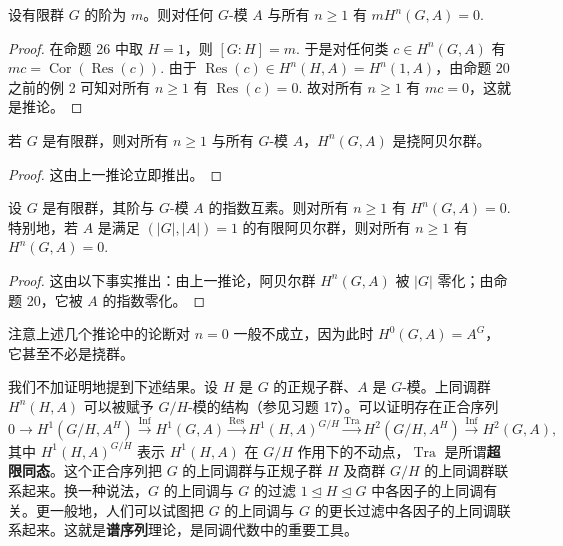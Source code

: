 \begin{corollary}\label{cor:17.27}
设有限群 \(G\) 的阶为 \(m\)。则对任何 \(G\)-模 \(A\) 与所有 \(n \geq 1\) 有 \(mH^n(G, A) = 0\).
\end{corollary}

\begin{proof}
在命题 26 中取 \(H = 1\)，则 \([G:H] = m\). 于是对任何类 \(c \in H^n(G, A)\) 有 \(mc = \operatorname{Cor}(\operatorname{Res}(c))\). 由于 \(\operatorname{Res}(c) \in H^n(H, A) = H^n(1, A)\)，由命题 20 之前的例 2 可知对所有 \(n \geq 1\) 有 \(\operatorname{Res}(c) = 0\). 故对所有 \(n \geq 1\) 有 \(mc = 0\)，这就是推论。
\end{proof}

\begin{corollary}\label{cor:17.28}
若 \(G\) 是有限群，则对所有 \(n \geq 1\) 与所有 \(G\)-模 \(A\)，\(H^n(G, A)\) 是挠阿贝尔群。
\end{corollary}

\begin{proof}
这由上一推论立即推出。
\end{proof}

\begin{corollary}\label{cor:17.29}
设 \(G\) 是有限群，其阶与 \(G\)-模 \(A\) 的指数互素。则对所有 \(n \geq 1\) 有 \(H^n(G, A) = 0\). 特别地，若 \(A\) 是满足 \((|G|, |A|) = 1\) 的有限阿贝尔群，则对所有 \(n \geq 1\) 有 \(H^n(G, A) = 0\).
\end{corollary}

\begin{proof}
这由以下事实推出：由上一推论，阿贝尔群 \(H^n(G, A)\) 被 \(|G|\) 零化；由命题 20，它被 \(A\) 的指数零化。
\end{proof}

注意上述几个推论中的论断对 \(n = 0\) 一般不成立，因为此时 \(H^0(G, A) = A^G\)，它甚至不必是挠群。

我们不加证明地提到下述结果。设 \(H\) 是 \(G\) 的正规子群、\(A\) 是 \(G\)-模。上同调群 \(H^n(H, A)\) 可以被赋予 \(G/H\)-模的结构（参见习题 17）。可以证明存在正合序列
\[
0 \to H^1(G/H, A^H) \xrightarrow{\operatorname{Inf}} H^1(G, A) \xrightarrow{\operatorname{Res}} H^1(H, A)^{G/H} \xrightarrow{\operatorname{Tra}} H^2(G/H, A^H) \xrightarrow{\operatorname{Inf}} H^2(G, A),
\]
其中 \(H^1(H, A)^{G/H}\) 表示 \(H^1(H, A)\) 在 \(G/H\) 作用下的不动点，\(\operatorname{Tra}\) 是所谓\textbf{超限同态}。这个正合序列把 \(G\) 的上同调群与正规子群 \(H\) 及商群 \(G/H\) 的上同调群联系起来。换一种说法，\(G\) 的上同调与 \(G\) 的过滤 \(1 \trianglelefteq H \trianglelefteq G\) 中各因子的上同调有关。更一般地，人们可以试图把 \(G\) 的上同调与 \(G\) 的更长过滤中各因子的上同调联系起来。这就是\textbf{谱序列}理论，是同调代数中的重要工具。

